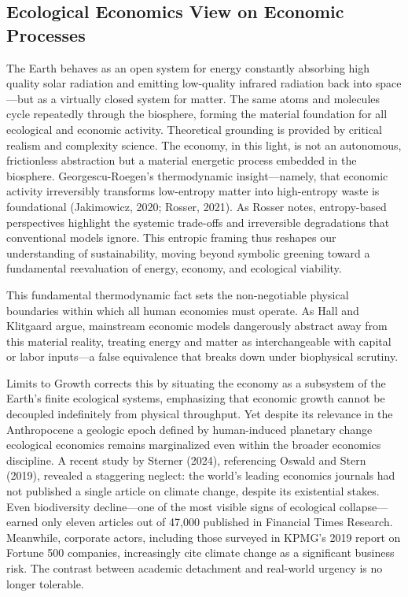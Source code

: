 \documentclass[a4paper,12pt]{article}
\begin{document}
\subsection{Ecological Economics View on Economic Processes}
The Earth behaves as an open system for energy constantly absorbing high quality solar radiation and emitting low-quality infrared radiation back into space—but as a virtually closed system for matter. The same atoms and molecules cycle repeatedly through the biosphere, forming the material foundation for all ecological and economic activity.
Theoretical grounding is provided by critical realism and complexity science. The economy, in this light, is not an autonomous, frictionless abstraction but a material energetic process embedded in the biosphere. Georgescu-Roegen’s thermodynamic insight—namely, that economic activity irreversibly transforms low-entropy matter into high-entropy waste is foundational (Jakimowicz, 2020; Rosser, 2021). As Rosser notes, entropy-based perspectives highlight the systemic trade-offs and irreversible degradations that conventional models ignore. This entropic framing thus reshapes our understanding of sustainability, moving beyond symbolic greening toward a fundamental reevaluation of energy, economy, and ecological viability.

This fundamental thermodynamic fact sets the non-negotiable physical boundaries within which all human economies must operate. As Hall and Klitgaard argue, mainstream economic models dangerously abstract away from this material reality, treating energy and matter as interchangeable with capital or labor inputs—a false equivalence that breaks down under biophysical scrutiny.

Limits to Growth corrects this by situating the economy as a subsystem of the Earth's finite ecological systems, emphasizing that economic growth cannot be decoupled indefinitely from physical throughput. Yet despite its relevance in the Anthropocene a geologic epoch defined by human-induced planetary change ecological economics remains marginalized even within the broader economics discipline. A recent study by Sterner (2024), referencing Oswald and Stern (2019), revealed a staggering neglect: the world’s leading economics journals had not published a single article on climate change, despite its existential stakes. Even biodiversity decline—one of the most visible signs of ecological collapse—earned only eleven articles out of 47,000 published in Financial Times Research. Meanwhile, corporate actors, including those surveyed in KPMG’s 2019 report on Fortune 500 companies, increasingly cite climate change as a significant business risk. The contrast between academic detachment and real-world urgency is no longer tolerable.
\end{document}
